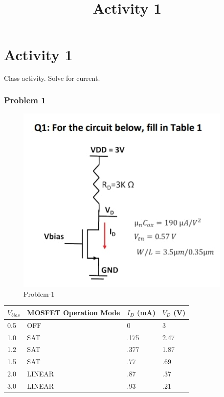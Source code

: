 \documentclass[11pt]{article}
\title{Activity 1}
\begin{document}
    
    \maketitle
    
    

    
    \hypertarget{activity-1}{%
\section{Activity 1}\label{activity-1}}

Class activity. Solve for current.

    \hypertarget{problem-1}{%
\subsubsection{Problem 1}\label{problem-1}}

\begin{figure}
\centering
\includegraphics{./image/act1_p1.jpg}
\caption{Problem-1}
\end{figure}

    \begin{longtable}[]{@{}llll@{}}
\toprule
\(V_{bias}\) & MOSFET Operation Mode & \(I_D\) (mA) & \(V_D\)
(V)\tabularnewline
\midrule
\endhead
0.5 & OFF & 0 & 3\tabularnewline
1.0 & SAT & .175 & 2.47\tabularnewline
1.2 & SAT & .377 & 1.87\tabularnewline
1.5 & SAT & .77 & .69\tabularnewline
2.0 & LINEAR & .87 & .37\tabularnewline
3.0 & LINEAR & .93 & .21\tabularnewline
\bottomrule
\end{longtable}
\end{document}

